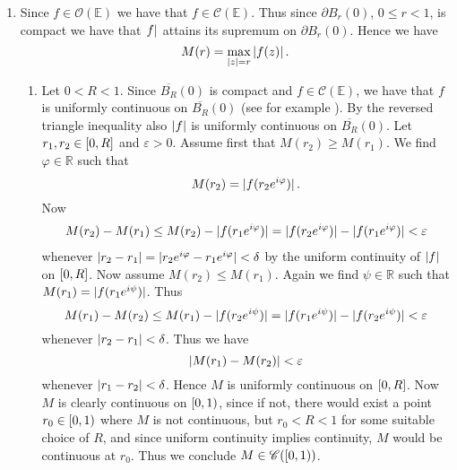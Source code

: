 \begin{enumerate}[label = \textbf{Exercise \arabic*.},wide = 0pt, itemsep=1.5ex]
	\item
		Since $f \in \mathcal{O}(\mathbb{E})$ we have that $f \in \mathscr{C}(\mathbb{E})$. Thus since $\partial B_r(0)$, $0 \leq r < 1$, is compact we have that $\abs{f}$ attains its supremum on $\partial B_r(0)$. Hence we have 
				\begin{equation}
					M(r) = \max_{\abs[0]{z} = r} \abs[0]{f(z)}.
				\end{equation}
		\begin{enumerate}[label = (\roman*),wide = 0pt, itemsep=1.5ex]
			\item Let $0 < R < 1$. Since $\overline{B_R}(0)$ is compact and $f \in \mathscr{C}(\mathbb{E})$, we have that $f$ is uniformly continuous on $\overline{B_R}(0)$ (see for example \cite[138]{alt2016linear}). By the reversed triangle inequality also $\abs[0]{f}$ is uniformly continuous on $\overline{B_R}(0)$. Let $r_1,r_2 \in \intcc{0,R}$ and $\varepsilon > 0$. Assume first that $M(r_2) \geq M(r_1)$. We find $\varphi \in \mathbb{R}$ such that
				\begin{equation}
					M(r_2) = \abs[0]{f(r_2 e^{i\varphi})}.
				\end{equation}
				Now
				\begin{align*}
					M(r_2) - M(r_1) \leq M(r_2) - \abs[0]{f(r_1e^{i\varphi})} = \abs[0]{f(r_2e^{i\varphi})} - \abs[0]{f(r_1e^{i\varphi})} < \varepsilon
				\end{align*}
				\noindent whenever $\abs[0]{r_2 - r_1} = \abs[0]{r_2e^{i\varphi} - r_1e^{i\varphi}} < \delta$ by the uniform continuity of $\abs[0]{f}$ on $\intcc{0,R}$. Now assume $M(r_2) \leq M(r_1)$. Again we find $\psi \in \mathbb{R}$ such that $M(r_1) = \abs[0]{f(r_1e^{i\psi})}$. Thus
				\begin{equation}
					M(r_1) - M(r_2) \leq M(r_1) - \abs[0]{f(r_2e^{i\psi})} = \abs[0]{f(r_1e^{i\psi})} - \abs[0]{f(r_2e^{i\psi})} < \varepsilon
				\end{equation}
				\noindent whenever $\abs[0]{r_2 - r_1} < \delta$. Thus we have
				\begin{equation}
					\abs[0]{M(r_1) - M(r_2)} < \varepsilon
				\end{equation}
				\noindent whenever $\abs[0]{r_1 - r_2} < \delta$. Hence $M$ is uniformly continuous on $\intcc{0,R}$. Now $M$ is clearly continuous on $\intco{0,1}$, since if not, there would exist a point $r_0 \in \intco{0,1}$ where $M$ is not continuous, but $r_0 < R < 1$ for some suitable choice of $R$, and since uniform continuity implies continuity, $M$ would be continuous at $r_0$. Thus we conclude $M \in \mathscr{C}(\intco{0,1})$.\\

\end{enumerate}
\end{enumerate}
